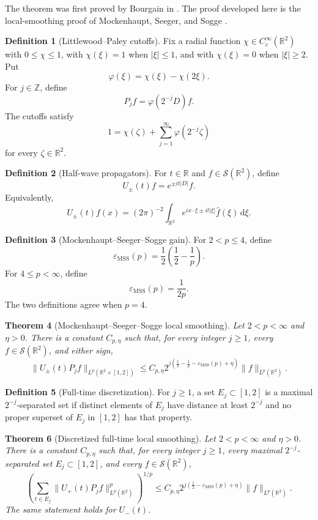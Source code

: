 \documentclass[11pt]{article}
\numberwithin{equation}{section}
\newtheorem{theorem}{Theorem}[section]
\theoremstyle{definition}
\newtheorem{definition}[theorem]{Definition}
\theoremstyle{remark}
\newcommand{\R}{\mathbb R}
\newcommand{\Z}{\mathbb Z}
\newcommand{\Sch}{\mathcal S}
\newcommand{\epsMSS}{\varepsilon_{\mathrm{MSS}}}
\newcommand{\dd}{\,\mathrm d}
\begin{document}
The theorem was first proved by Bourgain in \cite{Bourgain1986}.  The proof developed here is the local-smoothing proof of Mockenhaupt, Seeger, and Sogge \cite{MSS1992,MSS1993}.

\begin{definition}[Littlewood--Paley cutoffs]\label{def:intro-lp-cutoffs}
Fix a radial function $\chi\in C_c^\infty(\R^2)$ with $0\le\chi\le1$, with $\chi(\xi)=1$ when $|\xi|\le1$, and with $\chi(\xi)=0$ when $|\xi|\ge2$.  Put
\[
\varphi(\xi)=\chi(\xi)-\chi(2\xi).
\]
For $j\in\Z$, define
\[
P_jf=\varphi(2^{-j}D)f.
\]
The cutoffs satisfy
\[
1=\chi(\zeta)+\sum_{j=1}^{\infty}\varphi(2^{-j}\zeta)
\]
for every $\zeta\in\R^2$.
\end{definition}

\begin{definition}[Half-wave propagators]\label{def:intro-half-wave}
For $t\in\R$ and $f\in\Sch(\R^2)$, define
\[
U_\pm(t)f=e^{\pm it|D|}f.
\]
Equivalently,
\[
U_\pm(t)f(x)=(2\pi)^{-2}\int_{\R^2}e^{ix\cdot\xi\pm it|\xi|}\widehat f(\xi)\dd\xi.
\]
\end{definition}

\begin{definition}[Mockenhaupt--Seeger--Sogge gain]\label{def:intro-mss-gain}
For $2<p\le4$, define
\[
\epsMSS(p)=\frac12\left(\frac12-\frac1p\right).
\]
For $4\le p<\infty$, define
\[
\epsMSS(p)=\frac1{2p}.
\]
The two definitions agree when $p=4$.
\end{definition}

\begin{theorem}[Mockenhaupt--Seeger--Sogge local smoothing]\label{thm:intro-mss-local-smoothing}
Let $2<p<\infty$ and $\eta>0$.  There is a constant $C_{p,\eta}$ such that, for every integer $j\ge1$, every $f\in\Sch(\R^2)$, and either sign,
\[
\|U_\pm(t)P_jf\|_{L^p(\R^2\times[1,2])}
\le C_{p,\eta}2^{j(\frac12-\frac1p-\epsMSS(p)+\eta)}\|f\|_{L^p(\R^2)}.
\]
\end{theorem}

\begin{definition}[Full-time discretization]\label{def:intro-time-discretization}
For $j\ge1$, a set $E_j\subset[1,2]$ is a maximal $2^{-j}$-separated set if distinct elements of $E_j$ have distance at least $2^{-j}$ and no proper superset of $E_j$ in $[1,2]$ has that property.
\end{definition}

\begin{theorem}[Discretized full-time local smoothing]\label{thm:intro-discrete-local-smoothing}
Let $2<p<\infty$ and $\eta>0$.  There is a constant $C_{p,\eta}$ such that, for every integer $j\ge1$, every maximal $2^{-j}$-separated set $E_j\subset[1,2]$, and every $f\in\Sch(\R^2)$,
\[
\left(\sum_{t\in E_j}\|U_+(t)P_jf\|_{L^p(\R^2)}^p\right)^{1/p}
\le C_{p,\eta}2^{j(\frac12-\epsMSS(p)+\eta)}\|f\|_{L^p(\R^2)}.
\]
The same statement holds for $U_-(t)$.
\end{theorem}
\end{document}
